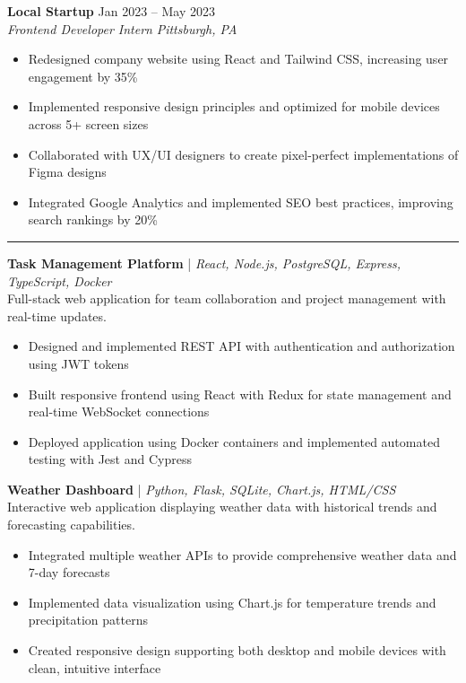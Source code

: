 \documentclass[11pt]{article}
\newcommand{\sectionhead}[1]{\vspace{0.4em}\noindent{\large\bfseries #1}\vspace{0.15em}\hrule\vspace{0.4em}}
\newcommand{\daterange}[1]{\hfill {\small #1}}
\newcommand{\role}[1]{\emph{#1}}
\newenvironment{tightitemize}{\begin{itemize}[leftmargin=1.5em,topsep=0pt,itemsep=1pt,parsep=0pt,partopsep=0pt]}{\end{itemize}}
\begin{document}
\vspace{0.3em}
\noindent\textbf{Local Startup} \daterange{Jan 2023 -- May 2023}\\
\role{Frontend Developer Intern} \daterange{\emph{Pittsburgh, PA}}
\begin{tightitemize}
  \item Redesigned company website using React and Tailwind CSS, increasing user engagement by 35\%
  \item Implemented responsive design principles and optimized for mobile devices across 5+ screen sizes
  \item Collaborated with UX/UI designers to create pixel-perfect implementations of Figma designs
  \item Integrated Google Analytics and implemented SEO best practices, improving search rankings by 20\%
\end{tightitemize}

\sectionhead{Projects}
\noindent\textbf{Task Management Platform} | \emph{React, Node.js, PostgreSQL, Express, TypeScript, Docker}\\
Full-stack web application for team collaboration and project management with real-time updates.
\begin{tightitemize}
  \item Designed and implemented REST API with authentication and authorization using JWT tokens
  \item Built responsive frontend using React with Redux for state management and real-time WebSocket connections
  \item Deployed application using Docker containers and implemented automated testing with Jest and Cypress
\end{tightitemize}

\vspace{0.3em}
\noindent\textbf{Weather Dashboard} | \emph{Python, Flask, SQLite, Chart.js, HTML/CSS}\\
Interactive web application displaying weather data with historical trends and forecasting capabilities.
\begin{tightitemize}
  \item Integrated multiple weather APIs to provide comprehensive weather data and 7-day forecasts
  \item Implemented data visualization using Chart.js for temperature trends and precipitation patterns
  \item Created responsive design supporting both desktop and mobile devices with clean, intuitive interface
\end{tightitemize}
\end{document}
